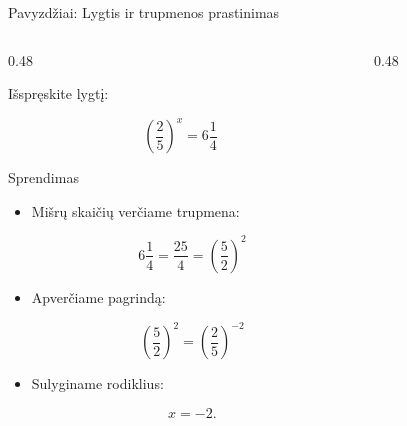 \documentclass[aspectratio=169,10pt]{beamer}
\begin{document}

\begin{frame}{Pavyzdžiai: Lygtis ir trupmenos prastinimas}

    \begin{columns}[T]

        \begin{column}{0.48\textwidth}

            \begin{example}[1]

                Išspręskite lygtį:

                \[
                \left(\frac{2}{5}\right)^x
                =
                6\frac{1}{4}
                \]

            \end{example}

            \begin{block}{Sprendimas}

                \begin{itemize}

                    \item
                    Mišrų skaičių verčiame trupmena:

                    \[
                    6\frac14
                    =
                    \frac{25}{4}
                    =
                    \left(\frac52\right)^2
                    \]

                    \item
                    Apverčiame pagrindą:

                    \[
                    \left(\frac52\right)^2
                    =
                    \left(\frac25\right)^{-2}
                    \]

                    \item
                    Sulyginame rodiklius:

                    \[
                    x=-2.
                    \]

                \end{itemize}

            \end{block}

        \end{column}

        \begin{column}{0.48\textwidth}


\end{column}
\end{columns}
\end{frame}
\end{document}
